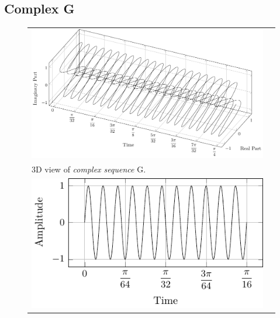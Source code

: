 \documentclass[../../course]{subfiles}
\begin{document}
\subsection{Complex G}

\begin{figure} [H]

    \renewcommand{\arraystretch}{0.75}
    \centering
    \begin{NiceTabularX} {\textwidth} {
            *{2}{>{\centering\arraybackslash}X}
        }

         {
             {
                \includegraphics[height = \textheight] {tikzpics/plotComplexG.pdf}
            }
        }

        &
        \\

         {
            \vbox{
                 {3D view of \emph{complex sequence} G.}
                \label{plt:cmplxG}
            }
        }

        &
        \\

         {
             {
                \includegraphics[height = \textheight] {tikzpics/plotShortX3.pdf}
            }
        }


\end{NiceTabularX}
\end{figure}
\end{document}
